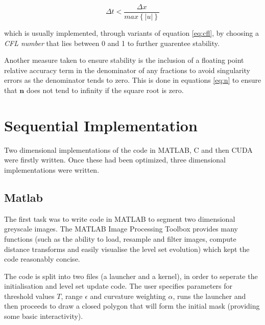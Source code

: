 \begin{equation}
\Delta t < \frac{\Delta x}{max\left\{|u|\right\}}
\label{eq:cfl}
\end{equation}

which is usually implemented, through variants of equation \eqref{eq:cfl}, by choosing a \textit{CFL number} that lies between 0 and 1 to further guarentee stability.

Another measure taken to ensure stability is the inclusion of a floating point relative accuracy term in the denominator of any fractions to avoid singularity errors as the denominator tends to zero. This is done in equations \eqref{eq:n} to ensure that $\textbf{n}$ does not tend to infinity if the square root is zero.

\section{Sequential Implementation}
Two dimensional implementations of the code in MATLAB, C and then CUDA were firstly written. Once these had been optimized, three dimensional implementations were written. 



	\subsection{Matlab}
The first task was to write code in MATLAB to segment two dimensional greyscale images. The MATLAB Image Processing Toolbox provides many functions (such as the ability to load, resample and filter images, compute distance transforms and easily visualise the level set evolution) which kept the code reasonably concise. 

The code is split into two files (a launcher and a kernel), in order to seperate the initialisation and level set update code. The user specifies parameters for threshold values $T$, range $\epsilon$ and curvature weighting $\alpha$, runs the launcher and then proceeds to draw a closed polygon that will form the initial mask (providing some basic interactivity). 


